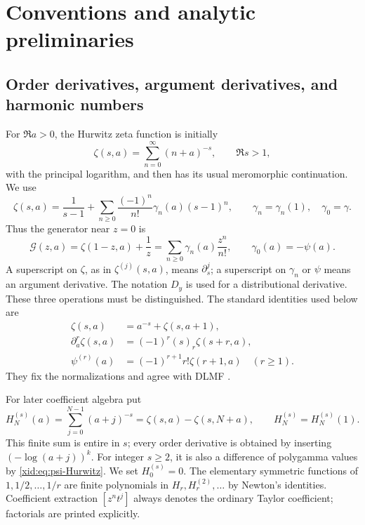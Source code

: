 \section{Conventions and analytic preliminaries}
\label{xid:sec:preliminaries}

\subsection{Order derivatives, argument derivatives, and harmonic numbers}

For $\Re a>0$, the Hurwitz zeta function is initially
\[
 \zeta(s,a)=\sum_{n=0}^{\infty}(n+a)^{-s},\qquad\Re s>1,
\]
with the principal logarithm, and then has its usual meromorphic
continuation. We use
\begin{equation}\label{xid:eq:Stieltjes-convention}
 \zeta(s,a)=\frac1{s-1}
  +\sum_{n\ge0}\frac{(-1)^n}{n!}\gamma_n(a)(s-1)^n,
 \qquad \gamma_n=\gamma_n(1),\quad\gamma_0=\gamma.
\end{equation}
Thus the generator near $z=0$ is
\begin{equation}\label{xid:eq:G-convention}
 \mathscr G(z,a)=\zeta(1-z,a)+\frac1z
       =\sum_{n\ge0}\gamma_n(a)\frac{z^n}{n!},
 \qquad\gamma_0(a)=-\psi(a).
\end{equation}
A superscript on $\zeta$, as in $\zeta^{(j)}(s,a)$, means
$\partial_s^j$; a superscript on $\gamma_n$ or $\psi$ means an
argument derivative. The notation $D_y$ is used for a distributional
derivative. These three operations must be distinguished.
The standard identities used below are
\begin{align}
 \zeta(s,a)&=a^{-s}+\zeta(s,a+1),\label{xid:eq:Hurwitz-shift}\\
 \partial_a^r\zeta(s,a)&=(-1)^r(s)_r\zeta(s+r,a),\label{xid:eq:Hurwitz-arg}\\
 \psi^{(r)}(a)&=(-1)^{r+1}r!\zeta(r+1,a)\quad(r\ge1).
 \label{xid:eq:psi-Hurwitz}
\end{align}
They fix the normalizations and agree with DLMF
\cite{DLMFhurwitz,hsh:DLMFPolygamma}.

For later coefficient algebra put
\[
 H_N^{(s)}(a)=\sum_{j=0}^{N-1}(a+j)^{-s}
             =\zeta(s,a)-\zeta(s,N+a),
 \qquad H_N^{(s)}=H_N^{(s)}(1).
\]
This finite sum is entire in $s$; every order derivative is obtained by
inserting $(-\log(a+j))^k$. For integer $s\ge2$, it is also a difference
of polygamma values by \eqref{xid:eq:psi-Hurwitz}. We set $H_0^{(s)}=0$.
The elementary symmetric functions of $1,1/2,\ldots,1/r$ are finite
polynomials in $H_r,H_r^{(2)},\ldots$ by Newton's identities.
Coefficient extraction $[z^nt^j]$ always denotes the ordinary Taylor
coefficient; factorials are printed explicitly.

